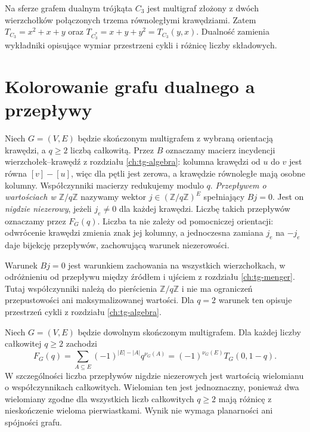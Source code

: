 \begin{przyklad}
Na sferze grafem dualnym trójkąta $C_3$ jest multigraf złożony
z dwóch wierzchołków połączonych trzema równoległymi
krawędziami. Zatem
$T_{C_3}=x^2+x+y$ oraz
$T_{C_3^*}=x+y+y^2=T_{C_3}(y,x)$.
Dualność zamienia wykładniki opisujące wymiar przestrzeni
cykli i różnicę liczby składowych.
\end{przyklad}

\section{Kolorowanie grafu dualnego a przepływy}
\label{sec:tg-flows-duality}

\begin{definicja}
Niech $G=(V,E)$ będzie skończonym multigrafem z wybraną
orientacją krawędzi, a $q\ge2$ liczbą całkowitą.
Przez $B$ oznaczamy macierz incydencji wierzchołek--krawędź
z rozdziału \ref{ch:tg-algebra}: kolumna krawędzi
od $u$ do $v$ jest równa $[v]-[u]$, więc dla pętli
jest zerowa, a krawędzie równoległe mają osobne kolumny.
Współczynniki macierzy redukujemy modulo $q$.
\emph{Przepływem o wartościach w $\mathbb Z/q\mathbb Z$}
nazywamy wektor $j\in(\mathbb Z/q\mathbb Z)^E$
spełniający $Bj=0$. Jest on \emph{nigdzie niezerowy}, jeżeli
$j_e\ne0$ dla każdej krawędzi. Liczbę takich przepływów
oznaczamy przez $F_G(q)$.
Liczba ta nie zależy od pomocniczej orientacji: odwrócenie
krawędzi zmienia znak jej kolumny, a jednoczesna zamiana
$j_e$ na $-j_e$ daje bijekcję przepływów, zachowującą
warunek niezerowości.
\end{definicja}

Warunek $Bj=0$ jest warunkiem zachowania na wszystkich
wierzchołkach, w odróżnieniu od przepływu między źródłem
i ujściem z rozdziału \ref{ch:tg-menger}.
Tutaj współczynniki należą do pierścienia
$\mathbb Z/q\mathbb Z$ i nie ma ograniczeń
przepustowości ani maksymalizowanej wartości.
Dla $q=2$ warunek ten opisuje przestrzeń cykli
z rozdziału \ref{ch:tg-algebra}.

\begin{twierdzenie}
\label{thm:tg-flow-tutte}
Niech $G=(V,E)$ będzie dowolnym skończonym multigrafem.
Dla każdej liczby całkowitej $q\ge2$ zachodzi
\[
F_G(q)=\sum_{A\subseteq E}(-1)^{|E|-|A|}q^{\nu_G(A)}
=(-1)^{\nu_G(E)}T_G(0,1-q).
\]
W szczególności liczba przepływów nigdzie niezerowych
jest wartością wielomianu o współczynnikach całkowitych.
Wielomian ten jest jednoznaczny, ponieważ dwa wielomiany
zgodne dla wszystkich liczb całkowitych $q\ge2$ mają
różnicę z nieskończenie wieloma pierwiastkami.
Wynik nie wymaga planarności ani spójności grafu.
\end{twierdzenie}

